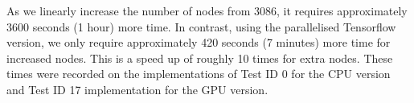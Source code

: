 As we linearly increase the number of nodes from 3086, it requires approximately 3600 seconds (1 hour) more time.
In contrast, using the parallelised Tensorflow version, we only require approximately 420 seconds (7 minutes) more time for increased nodes.
This is a speed up of roughly 10 times for extra nodes.
These times were recorded on the implementations of Test ID 0 for the CPU version and Test ID 17 implementation for the GPU version.


